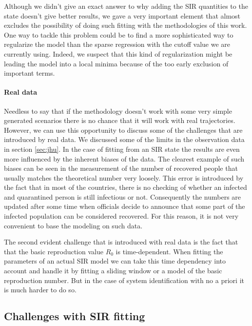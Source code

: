 \documentclass[12pt, letterpaper]{article}
\begin{document}
Although we didn't give an exact answer to why adding the SIR quantities to the state doesn't give better results, we gave a very important element that almost excludes the possibility of doing such fitting with the methodologies of this work. 
One way to tackle this problem could be to find a more sophisticated way to regularize the model than the sparse regression with the cutoff value we are currently using.
Indeed, we suspect that this kind of regularization might be leading the model into a local minima because of the too early exclusion of important terms.

\paragraph{Real data} 
Needless to say that if the methodology doesn't work with some very simple generated scenarios there is no chance that it will work with real trajectories. 
However, we can use this opportunity to discuss some of the challenges that are introduced by real data.
We discussed some of the limits in the observation data in section \ref{sec:jhu}.
In the case of fitting from an SIR state the results are even more influenced by the inherent biases of the data.
The clearest example of such biases can be seen in the measurement of the number of recovered people that usually matches the theoretical number very loosely. 
This error is introduced by the fact that in most of the countries, there is no checking of whether an infected and quarantined person is still infectious or not.
Consequently the numbers are updated after some time when officials decide to announce that some part of the infected population can be considered recovered.
For this reason, it is not very convenient to base the modeling on such data.

The second evident challenge that is introduced with real data is the fact that that the basic reproduction value $R_0$ is time-dependent.
When fitting the parameters of an actual SIR model we can take this time dependency into account and handle it by fitting a sliding window or a model of the basic reproduction number.
But in the case of system identification with no a priori it is much harder to do so.

\subsection{Challenges with SIR fitting}\label{sec:sirdiscu}
\end{document}
